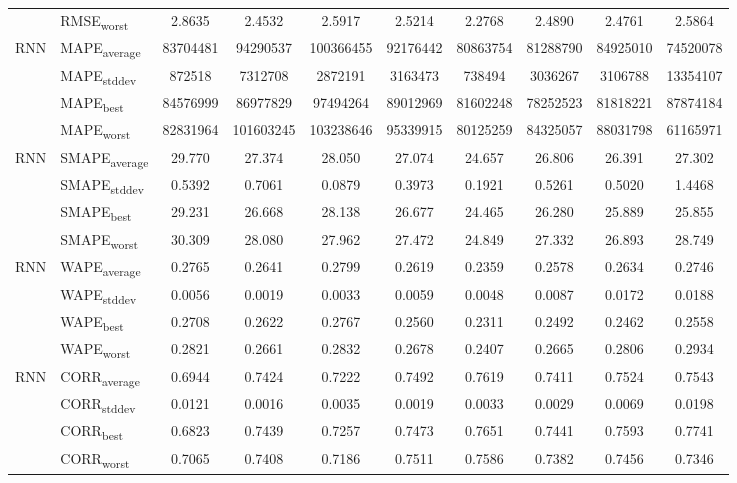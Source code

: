 {\begin{longtable}{l l c c c c c c c c}
 & RMSE\textsubscript{worst} & 2.8635 & 2.4532 & 2.5917 & 2.5214 & 2.2768 & 2.4890 & 2.4761 & 2.5864 \\
\cmidrule(lr){2-10}
\multirow{4}{*}{RNN} & MAPE\textsubscript{average} & 83704481 & 94290537 & 100366455 & 92176442 & 80863754 & 81288790 & 84925010 & 74520078 \\
 & MAPE\textsubscript{stddev} & 872518 & 7312708 & 2872191 & 3163473 & 738494 & 3036267 & 3106788 & 13354107 \\
 & MAPE\textsubscript{best} & 84576999 & 86977829 & 97494264 & 89012969 & 81602248 & 78252523 & 81818221 & 87874184 \\
 & MAPE\textsubscript{worst} & 82831964 & 101603245 & 103238646 & 95339915 & 80125259 & 84325057 & 88031798 & 61165971 \\
\cmidrule(lr){2-10}
\multirow{4}{*}{RNN} & SMAPE\textsubscript{average} & 29.770 & 27.374 & 28.050 & 27.074 & 24.657 & 26.806 & 26.391 & 27.302 \\
 & SMAPE\textsubscript{stddev} & 0.5392 & 0.7061 & 0.0879 & 0.3973 & 0.1921 & 0.5261 & 0.5020 & 1.4468 \\
 & SMAPE\textsubscript{best} & 29.231 & 26.668 & 28.138 & 26.677 & 24.465 & 26.280 & 25.889 & 25.855 \\
 & SMAPE\textsubscript{worst} & 30.309 & 28.080 & 27.962 & 27.472 & 24.849 & 27.332 & 26.893 & 28.749 \\
\cmidrule(lr){2-10}
\multirow{4}{*}{RNN} & WAPE\textsubscript{average} & 0.2765 & 0.2641 & 0.2799 & 0.2619 & 0.2359 & 0.2578 & 0.2634 & 0.2746 \\
 & WAPE\textsubscript{stddev} & 0.0056 & 0.0019 & 0.0033 & 0.0059 & 0.0048 & 0.0087 & 0.0172 & 0.0188 \\
 & WAPE\textsubscript{best} & 0.2708 & 0.2622 & 0.2767 & 0.2560 & 0.2311 & 0.2492 & 0.2462 & 0.2558 \\
 & WAPE\textsubscript{worst} & 0.2821 & 0.2661 & 0.2832 & 0.2678 & 0.2407 & 0.2665 & 0.2806 & 0.2934 \\
\cmidrule(lr){2-10}
\multirow{4}{*}{RNN} & CORR\textsubscript{average} & 0.6944 & 0.7424 & 0.7222 & 0.7492 & 0.7619 & 0.7411 & 0.7524 & 0.7543 \\
 & CORR\textsubscript{stddev} & 0.0121 & 0.0016 & 0.0035 & 0.0019 & 0.0033 & 0.0029 & 0.0069 & 0.0198 \\
 & CORR\textsubscript{best} & 0.6823 & 0.7439 & 0.7257 & 0.7473 & 0.7651 & 0.7441 & 0.7593 & 0.7741 \\
 & CORR\textsubscript{worst} & 0.7065 & 0.7408 & 0.7186 & 0.7511 & 0.7586 & 0.7382 & 0.7456 & 0.7346 \\

\end{longtable}}
